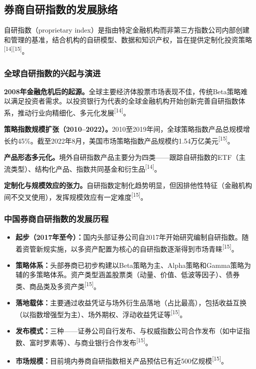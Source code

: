 \documentclass[10pt,a4paper,twocolumn]{ctexart}
\begin{document}
\subsection{券商自研指数的发展脉络}

自研指数（proprietary index）是指由特定金融机构而非第三方指数公司内部创建和管理的基准，结合机构的自研模型、数据和知识产权，旨在提供定制化投资策略\textsuperscript{[14][15]}。

\subsubsection{全球自研指数的兴起与演进}

\textbf{2008年金融危机后的起源。}全球主要经济体股票市场表现不佳，传统Beta策略难以满足投资者需求。以投资银行为代表的全球金融机构开始创新完善自研指数体系，推动行业向精细化、多元化发展\textsuperscript{[14]}。

\textbf{策略指数规模扩张（2010--2022）。}2010至2019年间，全球策略指数产品总规模增长约45\%。截至2022年8月，美国市场策略指数产品规模约1.54万亿美元\textsuperscript{[15]}。

\textbf{产品形态多元化。}境外自研指数产品主要分为四类——跟踪自研指数的ETF（主流类型）、结构化产品、指数共同基金和衍生品\textsuperscript{[14]}。

\textbf{定制化与规模效应的张力。}自研指数定制化趋势明显，但因排他性特征（金融机构间不交叉使用），发挥规模效应有一定难度\textsuperscript{[15]}。

\subsubsection{中国券商自研指数的发展历程}

\begin{itemize}
\item \textbf{起步（2017年至今）：}国内头部证券公司自2017年开始研究编制自研指数。随着资管新规实施，以多资产配置为核心的自研指数逐渐得到市场青睐\textsuperscript{[15]}。
\item \textbf{策略体系：}头部券商已初步构建以Beta策略为主、Alpha策略和Gamma策略为辅的多策略体系。资产类型涵盖股票类（动量、价值、低波等因子）、债券类、商品类及多资产类\textsuperscript{[15]}。
\item \textbf{落地载体：}主要通过收益凭证与场外衍生品落地（占比最高），包括收益互换（以指数增强型为主）、场外期权、浮动收益凭证等\textsuperscript{[15]}。
\item \textbf{发布模式：}三种——证券公司自行发布、与权威指数公司合作发布（如中证指数、富时罗素等）、与商业银行合作发布\textsuperscript{[15]}。
\item \textbf{市场规模：}目前境内券商自研指数相关产品预估已有近500亿规模\textsuperscript{[15]}。
\end{itemize}
\end{document}
